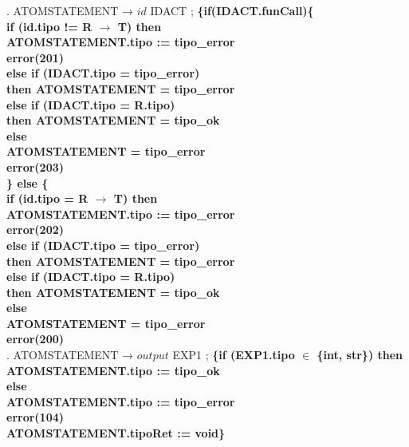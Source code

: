 \begin{tabbing}
    . ATOMSTATEMENT → $id$ IDACT ; \> \> \textbf{\{if(IDACT.funCall)\{}\\
    \> \> \> \textbf{if (id.tipo != R $\rightarrow$ T) then}\\
    \> \> \> \> \textbf{ATOMSTATEMENT.tipo := tipo\_error}\\
    \> \> \> \> \textbf{error(201)}\\
    \> \> \> \textbf{else if (IDACT.tipo = tipo\_error)}\\
    \> \> \> \> \textbf{then ATOMSTATEMENT = tipo\_error}\\
    \> \> \> \textbf{else if (IDACT.tipo = R.tipo)}\\
    \> \> \> \> \textbf{then ATOMSTATEMENT = tipo\_ok}\\
    \> \> \> \textbf{else}\\
    \> \> \> \> \textbf{ATOMSTATEMENT = tipo\_error}\\
    \> \> \> \> \textbf{error(203)}\\
    \> \> \textbf{\} else \{}\\
    \> \> \> \textbf{if (id.tipo = R $\rightarrow$ T) then}\\
    \> \> \> \> \textbf{ATOMSTATEMENT.tipo := tipo\_error}\\
    \> \> \> \> \textbf{error(202)}\\
    \> \> \> \textbf{else if (IDACT.tipo = tipo\_error)}\\
    \> \> \> \> \textbf{then ATOMSTATEMENT = tipo\_error}\\
    \> \> \> \textbf{else if (IDACT.tipo = R.tipo)}\\
    \> \> \> \> \textbf{then ATOMSTATEMENT = tipo\_ok}\\
    \> \> \> \textbf{else}\\
    \> \> \> \> \textbf{ATOMSTATEMENT = tipo\_error}\\
    \> \> \> \> \textbf{error(200)}\\
    . ATOMSTATEMENT → $output$ EXP1 ; \textbf{\{if (EXP1.tipo $\in$ \{int, str\}) then}\\
    \>                    \> \> \> \textbf{ATOMSTATEMENT.tipo := tipo\_ok}\\
    \>                    \> \>\textbf{else} \\
    \> \> \> \textbf{ATOMSTATEMENT.tipo := tipo\_error}\\
    \> \> \> \textbf{error(104)}\\
    \>                    \> \textbf{ATOMSTATEMENT.tipoRet := void\}}\\

\end{tabbing}
